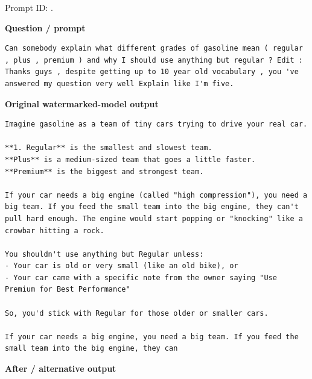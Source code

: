 Prompt ID:
\texttt{}.

\textbf{Question / prompt}

\begin{Verbatim}
Can somebody explain what different grades of gasoline mean ( regular , plus , premium ) and why I should use anything but regular ? Edit : Thanks guys , despite getting up to 10 year old vocabulary , you 've answered my question very well Explain like I'm five.
\end{Verbatim}

\textbf{Original watermarked-model output}

\begin{Verbatim}
Imagine gasoline as a team of tiny cars trying to drive your real car.

**1. Regular** is the smallest and slowest team.
**Plus** is a medium-sized team that goes a little faster.
**Premium** is the biggest and strongest team.

If your car needs a big engine (called "high compression"), you need a big team. If you feed the small team into the big engine, they can't pull hard enough. The engine would start popping or "knocking" like a crowbar hitting a rock.

You shouldn't use anything but Regular unless:
- Your car is old or very small (like an old bike), or
- Your car came with a specific note from the owner saying "Use Premium for Best Performance"

So, you'd stick with Regular for those older or smaller cars.

If your car needs a big engine, you need a big team. If you feed the small team into the big engine, they can
\end{Verbatim}

\textbf{After / alternative output}

